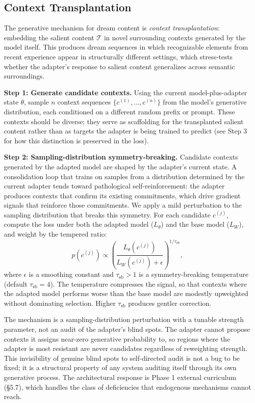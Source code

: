 \documentclass[11pt]{article}
\begin{document}
\subsection{Context Transplantation}

The generative mechanism for dream content is \emph{context transplantation}: embedding the salient content $\mathcal{T}$ in novel surrounding contexts generated by the model itself. This produces dream sequences in which recognizable elements from recent experience appear in structurally different settings, which stress-tests whether the adapter's response to salient content generalizes across semantic surroundings.

\medskip
\noindent\textbf{Step 1: Generate candidate contexts.} Using the current model-plus-adapter state $\theta$, sample $n$ context sequences $\{c^{(1)}, \ldots, c^{(n)}\}$ from the model's generative distribution, each conditioned on a different random prefix or prompt. These contexts should be diverse; they serve as scaffolding for the transplanted salient content rather than as targets the adapter is being trained to predict (see Step 3 for how this distinction is preserved in the loss).

\medskip
\noindent\textbf{Step 2: Sampling-distribution symmetry-breaking.} Candidate contexts generated by the adapted model are shaped by the adapter's current state. A consolidation loop that trains on samples from a distribution determined by the current adapter tends toward pathological self-reinforcement: the adapter produces contexts that confirm its existing commitments, which drive gradient signals that reinforce those commitments. We apply a mild perturbation to the sampling distribution that breaks this symmetry. For each candidate $c^{(j)}$, compute the loss under both the adapted model ($L_\theta$) and the base model ($L_W$), and weight by the tempered ratio:
\begin{equation}\label{eq:sb}
    p(c^{(j)}) \propto \left(\frac{L_\theta(c^{(j)})}{L_W(c^{(j)}) + \epsilon}\right)^{1/\tau_{\text{sb}}},
\end{equation}
where $\epsilon$ is a smoothing constant and $\tau_{\text{sb}} > 1$ is a symmetry-breaking temperature (default $\tau_{\text{sb}} = 4$). The temperature compresses the signal, so that contexts where the adapted model performs worse than the base model are modestly upweighted without dominating selection. Higher $\tau_{\text{sb}}$ produces gentler correction.

The mechanism is a sampling-distribution perturbation with a tunable strength parameter, not an audit of the adapter's blind spots. The adapter cannot propose contexts it assigns near-zero generative probability to, so regions where the adapter is most resistant are never candidates regardless of reweighting strength. This invisibility of genuine blind spots to self-directed audit is not a bug to be fixed; it is a structural property of any system auditing itself through its own generative process. The architectural response is Phase 1 external curriculum (\S 5.7), which handles the class of deficiencies that endogenous mechanisms cannot reach.
\end{document}
